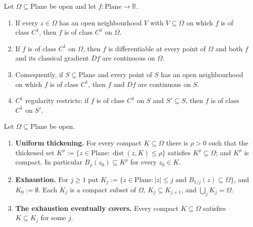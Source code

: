 \begin{proposition}
Let $\Omega\subseteq\mathrm{Plane}$ be open and let $f\colon\mathrm{Plane}\to\mathbb{R}$.
\begin{enumerate}
\item If every $z\in\Omega$ has an open neighbourhood $V$ with $V\subseteq\Omega$ on which $f$
is of class $C^{1}$, then $f$ is of class $C^{1}$ on $\Omega$.
\item If $f$ is of class $C^{1}$ on $\Omega$, then $f$ is differentiable at every point of
$\Omega$ and both $f$ and its classical gradient $Df$ are continuous on $\Omega$.
\item Consequently, if $S\subseteq\mathrm{Plane}$ and every point of $S$ has an open
neighbourhood on which $f$ is of class $C^{1}$, then $f$ and $Df$ are continuous on $S$.
\item $C^{1}$ regularity restricts: if $f$ is of class $C^{1}$ on $S$ and $S'\subseteq S$, then
$f$ is of class $C^{1}$ on $S'$.
\end{enumerate}
\end{proposition}

\begin{proposition}
Let $\Omega\subseteq\mathrm{Plane}$ be open.
\begin{enumerate}
\item \textbf{Uniform thickening.}  For every compact $K\subseteq\Omega$ there is $\rho>0$ such
that the thickened set $K^{\rho}:=\{z\in\mathrm{Plane}:\operatorname{dist}(z,K)\le\rho\}$
satisfies $K^{\rho}\subseteq\Omega$; and $K^{\rho}$ is compact.  In particular
$\overline{B_{\rho}(z_0)}\subseteq K^{\rho}$ for every $z_0\in K$.
\item \textbf{Exhaustion.}  For $j\ge1$ put
$K_j:=\{z\in\mathrm{Plane}:\lvert z\rvert\le j\text{ and }B_{1/j}(z)\subseteq\Omega\}$, and
$K_0:=\emptyset$.  Each $K_j$ is a compact subset of $\Omega$, $K_j\subseteq K_{j+1}$, and
$\bigcup_{j}K_j=\Omega$.
\item \textbf{The exhaustion eventually covers.}  Every compact $K\subseteq\Omega$ satisfies
$K\subseteq K_j$ for some $j$.
\end{enumerate}
\end{proposition}

